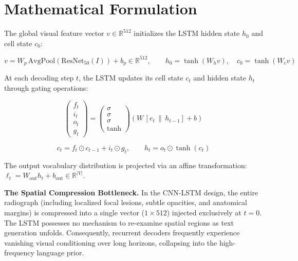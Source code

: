 \section{Mathematical Formulation}

The global visual feature vector $v \in \mathbb{R}^{512}$ initializes the LSTM hidden state $h_0$ and cell state $c_0$:

\begin{equation}
v = W_p\, \mathrm{AvgPool}\left(\mathrm{ResNet}_{50}(I)\right) + b_p \in \mathbb{R}^{512}, \qquad h_0 = \tanh(W_h v), \quad c_0 = \tanh(W_c v) \tag{4.1}
\end{equation}

At each decoding step $t$, the LSTM updates its cell state $c_t$ and hidden state $h_t$ through gating operations:

\begin{equation}
\begin{pmatrix} f_t \\ i_t \\ o_t \\ g_t \end{pmatrix} = \begin{pmatrix} \sigma \\ \sigma \\ \sigma \\ \tanh \end{pmatrix} \left( W\, [e_t \,\|\, h_{t-1}] + b \right) \tag{4.2}
\end{equation}

\begin{equation}
c_t = f_t \odot c_{t-1} + i_t \odot g_t, \qquad h_t = o_t \odot \tanh(c_t) \tag{4.3}
\end{equation}

The output vocabulary distribution is projected via an affine transformation: $\ell_t = W_{\text{out}} h_t + b_{\text{out}} \in \mathbb{R}^{|V|}$.

\begin{takeawaybox}
\textbf{The Spatial Compression Bottleneck.}
In the CNN-LSTM design, the entire radiograph (including localized focal lesions, subtle opacities, and anatomical margins) is compressed into a single vector ($1 \times 512$) injected exclusively at $t=0$. The LSTM possesses no mechanism to re-examine spatial regions as text generation unfolds. Consequently, recurrent decoders frequently experience vanishing visual conditioning over long horizons, collapsing into the high-frequency language prior.
\end{takeawaybox}
